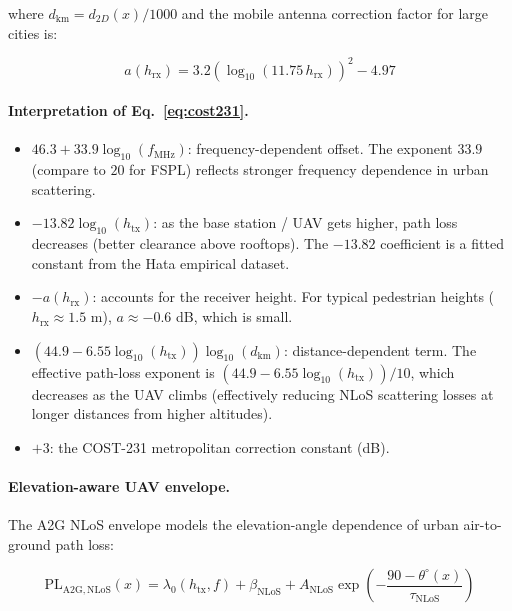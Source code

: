 \documentclass[11pt,a4paper]{article}
\begin{document}
where $d_{\mathrm{km}} = d_{2D}(x)/1000$ and the mobile antenna correction
factor for large cities is:

\begin{equation}
a(h_{\mathrm{rx}}) = 3.2(\log_{10}(11.75\,h_{\mathrm{rx}}))^2 - 4.97
\label{eq:cost231_a}
\end{equation}

\paragraph{Interpretation of Eq.~\eqref{eq:cost231}.}
\begin{itemize}
\item $46.3 + 33.9\log_{10}(f_{\mathrm{MHz}})$: frequency-dependent offset.
      The exponent $33.9$ (compare to $20$ for FSPL) reflects stronger
      frequency dependence in urban scattering.
\item $-13.82\log_{10}(h_{\mathrm{tx}})$: as the base station / UAV gets
      higher, path loss decreases (better clearance above rooftops). The
      $-13.82$ coefficient is a fitted constant from the Hata empirical
      dataset.
\item $-a(h_{\mathrm{rx}})$: accounts for the receiver height. For typical
      pedestrian heights ($h_{\mathrm{rx}} \approx 1.5$ m), $a \approx
      -0.6$ dB, which is small.
\item $(44.9 - 6.55\log_{10}(h_{\mathrm{tx}}))\log_{10}(d_{\mathrm{km}})$:
      distance-dependent term. The effective path-loss exponent is
      $(44.9 - 6.55\log_{10}(h_{\mathrm{tx}}))/10$, which decreases as the
      UAV climbs (effectively reducing NLoS scattering losses at longer
      distances from higher altitudes).
\item $+3$: the COST-231 metropolitan correction constant (dB).
\end{itemize}

\paragraph{Elevation-aware UAV envelope.}
The A2G NLoS envelope models the elevation-angle dependence of urban air-to-ground path loss:

\begin{equation}
\mathrm{PL}_{\mathrm{A2G,NLoS}}(x)
=
\lambda_0(h_{\mathrm{tx}}, f)
+ \beta_{\mathrm{NLoS}}
+ A_{\mathrm{NLoS}}
\exp\!\left(-\frac{90-\theta^\circ(x)}{\tau_{\mathrm{NLoS}}}\right)
\label{eq:a2g_nlos}
\end{equation}
\end{document}
